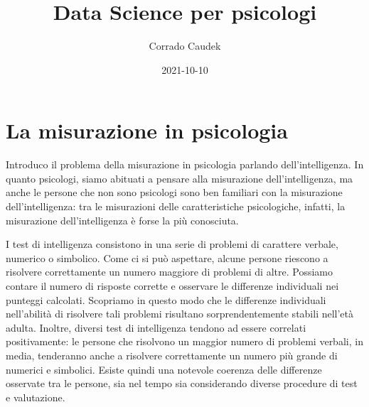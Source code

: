 \documentclass[
]{memoir}
\title{Data Science per psicologi}
\author{Corrado Caudek}
\date{2021-10-10}
\theoremstyle{definition}
\theoremstyle{definition}
\theoremstyle{definition}
\theoremstyle{definition}
\theoremstyle{remark}
\begin{document}
\maketitle

{
\hypersetup{linkcolor=}
\setcounter{tocdepth}{1}
\tableofcontents
}
\newpage

\vspace*{5cm}

\thispagestyle{empty}

\hypertarget{chapter-misurazione}{%
\chapter{La misurazione in psicologia}\label{chapter-misurazione}}

Introduco il problema della misurazione in psicologia parlando dell'intelligenza. In quanto psicologi, siamo abituati a pensare alla misurazione dell'intelligenza, ma anche le persone che non sono psicologi sono ben familiari con la misurazione dell'intelligenza: tra le misurazioni delle caratteristiche psicologiche, infatti, la misurazione dell'intelligenza è forse la più conosciuta.

I test di intelligenza consistono in una serie di problemi di carattere verbale, numerico o simbolico. Come ci si può aspettare, alcune persone riescono a risolvere correttamente un numero maggiore di problemi di altre. Possiamo contare il numero di risposte corrette e osservare le differenze individuali nei punteggi calcolati. Scopriamo in questo modo che le differenze individuali nell'abilità di risolvere tali problemi risultano sorprendentemente stabili nell'età adulta. Inoltre, diversi test di intelligenza tendono ad essere correlati positivamente: le persone che risolvono un maggior numero di problemi verbali, in media, tenderanno anche a risolvere correttamente un numero più grande di numerici e simbolici. Esiste quindi una notevole coerenza delle differenze osservate tra le persone, sia nel tempo sia considerando diverse procedure di test e valutazione.
\end{document}
